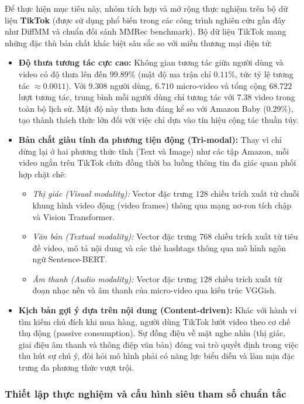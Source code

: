 Để thực hiện mục tiêu này, nhóm tích hợp và mở rộng thực nghiệm trên bộ dữ liệu \textbf{TikTok} (được sử dụng phổ biến trong các công trình nghiên cứu gần đây như DiffMM và chuẩn đối sánh MMRec benchmark). Bộ dữ liệu TikTok mang những đặc thù bản chất khác biệt sâu sắc so với miền thương mại điện tử:
\begin{itemize}[leftmargin=*]
    \item \textbf{Độ thưa tương tác cực cao:} Không gian tương tác giữa người dùng và video có độ thưa lên đến $99.89\%$ (mật độ ma trận chỉ $0.11\%$, tức tỷ lệ tương tác $\approx 0.0011$). Với $9.308$ người dùng, $6.710$ micro-video và tổng cộng $68.722$ lượt tương tác, trung bình mỗi người dùng chỉ tương tác với $7.38$ video trong toàn bộ lịch sử. Mật độ này thưa hơn đáng kể so với Amazon Baby ($0.29\%$), tạo thành thách thức lớn đối với việc chỉ dựa vào tín hiệu cộng tác thuần túy.
    \item \textbf{Bản chất giàu tính đa phương tiện động (Tri-modal):} Thay vì chỉ dừng lại ở hai phương thức tĩnh (Text và Image) như các tập Amazon, mỗi video ngắn trên TikTok chứa đồng thời ba luồng thông tin đa giác quan phối hợp chặt chẽ:
    \begin{itemize}
        \item \textit{Thị giác (Visual modality):} Vector đặc trưng $128$ chiều trích xuất từ chuỗi khung hình video động (video frames) thông qua mạng nơ-ron tích chập và Vision Transformer.
        \item \textit{Văn bản (Textual modality):} Vector đặc trưng $768$ chiều trích xuất từ tiêu đề video, mô tả nội dung và các thẻ hashtags thông qua mô hình ngôn ngữ Sentence-BERT.
        \item \textit{Âm thanh (Audio modality):} Vector đặc trưng $128$ chiều trích xuất từ đoạn nhạc nền và âm thanh của micro-video qua kiến trúc VGGish.
    \end{itemize}
    \item \textbf{Kịch bản gợi ý dựa trên nội dung (Content-driven):} Khác với hành vi tìm kiếm chủ đích khi mua hàng, người dùng TikTok lướt video theo cơ chế thụ động (passive consumption). Sự đồng điệu về mặt nghe nhìn (thị giác, giai điệu âm thanh và thông điệp văn bản) đóng vai trò quyết định trong việc thu hút sự chú ý, đòi hỏi mô hình phải có năng lực biểu diễn và làm mịn đặc trưng đa phương thức vượt trội.
\end{itemize}

\subsubsection{Thiết lập thực nghiệm và cấu hình siêu tham số chuẩn tắc}

